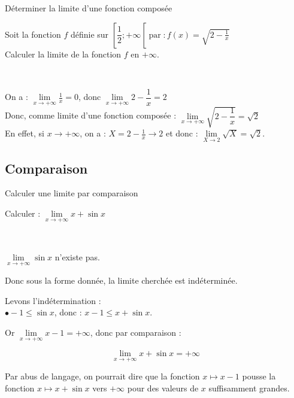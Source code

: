 \begin{bmethodet}{Déterminer la limite d'une fonction composée}
	
	Soit la fonction $f$ définie sur $\left[\dfrac{1}{2} ;+\infty\left[\operatorname{par}: f(x)=\sqrt{2-\frac{1}{x}}\right.\right.$\\
	Calculer la limite de la fonction $f$ en $+\infty$.
	
	\ \\
	
	On a : $\lim \limits_{x \rightarrow+\infty} \frac{1}{x}=0$, donc $\lim \limits_{x \rightarrow+\infty} 2-\dfrac{1}{x}=2$\\
	Donc, comme limite d'une fonction composée : $\lim \limits_{x \rightarrow+\infty} \sqrt{2-\dfrac{1}{x}}=\sqrt{2}$\\
	En effet, si $x \rightarrow+\infty$, on a : $X=2-\frac{1}{x} \rightarrow 2$ et donc : $\lim \limits_{X \rightarrow 2} \sqrt{X}=\sqrt{2}$.
\end{bmethodet}

\subsection{Comparaison}

\begin{bmethodet}{Calculer une limite par comparaison}
	
	Calculer : $\lim \limits_{x \rightarrow+\infty} x+\sin x$
	
	\ \\
	
	\begin{itemMet}
		\item $\lim \limits_{x \rightarrow+\infty} \sin x$ n'existe pas.
	\end{itemMet}
	
	Donc sous la forme donnée, la limite cherchée est indéterminée.
	
	Levons l'indétermination :\\
	$\bullet-1 \leq \sin x$, donc : $x-1 \leq x+\sin x$.
	
	\begin{itemMet}
		\item Or $\lim \limits_{x \rightarrow+\infty} x-1=+\infty$, donc par comparaison :
	\end{itemMet}
	
	$$
	\lim \limits_{x \rightarrow+\infty} x+\sin x=+\infty
	$$
	
	Par abus de langage, on pourrait dire que la fonction $x \longmapsto x-1$ pousse la fonction $x \longmapsto x+\sin x$ vers $+\infty$ pour des valeurs de $x$ suffisamment grandes.
\end{bmethodet}